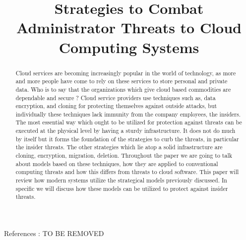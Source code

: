\documentclass[conference]{IEEEtran}
\begin{document}
\title{Strategies to Combat Administrator Threats to Cloud Computing Systems}
\author{
  \and
}

\maketitle

\begin{abstract}
  Cloud services are becoming increasingly popular in the world of technology, as more and more people have come to rely on these services to store personal and private data. Who is to say that the organizations which give cloud based commodities are dependable and secure ? Cloud service providers use techniques such as, data encryption, and cloning for protecting themselves against outside attacks, but individually these techniques lack immunity from the company employees, the insiders. The most essential way which ought to be utilized for protection against threats can be executed at the physical level by having a sturdy infrastructure. It does not do much by itself but it forms the foundation of the strategies to curb the threats, in particular the insider threats. The other strategies which lie atop a solid infrastructure are cloning, encryption, migration, deletion. Throughout the paper we are going to talk about models based on these techniques, how they are applied to conventional computing threats and how this differs from threats to cloud software. This paper will review how modern systems utilize the strategical models previously discussed. In specific we will discuss how these models can be utilized to protect against insider threats.
\end{abstract}

References : TO BE REMOVED \cite{baumann} \cite{subashini} \cite{kamalkant} \cite{chou} \cite{chen} \cite{althebyan} \cite{yun} \cite{sirer} \cite{theoharidou} \cite{bishop} \cite{nguyen} \cite{magklaras} \cite{dimitrios} \cite{suh} \cite{szefer} \cite{oltsik}
\cite{sabahi} \cite{dawoud} \cite{mukherjee} \cite{dwoskin} \cite{spitzner} \cite{kandias}

\IEEEpeerreviewmaketitle











\end{document}
